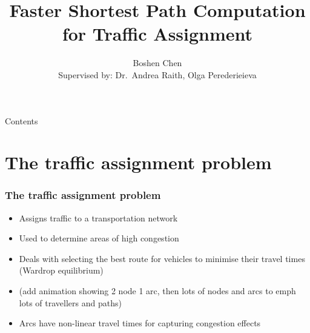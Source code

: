 \documentclass{beamer}
\author[Boshen Chen]{Boshen Chen \\{\small Supervised by: Dr.\ Andrea Raith, Olga Perederieieva}}
\title[Faster Shortest Path Computation for Traffic Assignment]{Faster Shortest Path Computation for Traffic Assignment}
\institute[UoA]{
    Department of Engineering Science\\
    University of Auckland\\
}
\date{}
\begin{document}
\begin{frame}[plain]
    \titlepage
\end{frame}

\setcounter{framenumber}{0}

\begin{frame}{Contents}
    \tableofcontents
\end{frame}

\section{The traffic assignment problem}
\begin{frame}
    \frametitle{The traffic assignment problem}
    \begin{itemize}
        \itemsep1em
        \item Assigns traffic to a transportation network
        \item Used to determine areas of \alert{high congestion} %
        \item Deals with \alert{selecting the best route} for vehicles to \alert{minimise their travel times} (Wardrop equilibrium)
        \item (add animation showing 2 node 1 arc, then lots of nodes and arcs to emph lots of travellers and paths)
        \item Arcs have \alert{non-linear travel times} for capturing \alert{congestion} effects
    \end{itemize}
\end{frame}
\end{document}
